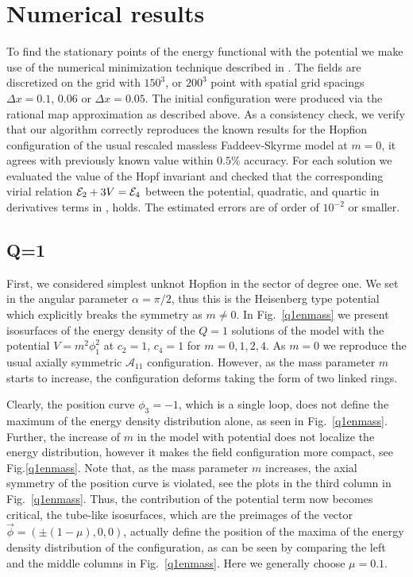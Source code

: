 \documentclass[12pt,a4paper]{article}
\begin{document}
\section{Numerical results}
To find the stationary points of the energy functional  with the potential
 we make use of the numerical minimization technique described in \cite{Samoilenka:2015bsf,Samoilenka:2016wys}.
The fields are discretized on the grid with $150^3$, or $200^3$ point with  spatial grid spacings
$\Delta x=0.1$, $0.06$ or $\Delta x=0.05$. The initial configuration were produced via the rational map
approximation as described above.
As a consistency check, we verify that our algorithm correctly reproduces the known results for the Hopfion
configuration of the usual rescaled
massless Faddeev-Skyrme model at $m=0$, it agrees with previously known value within $0.5 \%$ accuracy.
For each solution  we evaluated the value of the Hopf invariant and checked that the
corresponding virial relation $  \mathcal{E}_2+3 V = \mathcal{E}_4 $
between the potential, quadratic, and quartic in derivatives terms in ,
holds. The estimated errors are of order of $10^{-2}$ or smaller.



\subsection{Q=1}
First, we considered simplest unknot Hopfion in the sector of degree one. We set in 
the angular parameter $\alpha=\pi/2$, thus this is the Heisenberg type potential which explicitly breaks the symmetry as $m\neq 0$.
In Fig.~\ref{q1enmass} we present isosurfaces of the energy density of the $Q=1$ solutions of the model
 with the potential $V=m^2\phi_1^2$ at $c_2=1$, $c_4=1$ for $m=0, 1, 2, 4$.
As $m=0$ we reproduce the usual axially symmetric $\mathcal{A}_{11}$ configuration. However, as the mass parameter $m$ starts to increase,
the configuration deforms taking the form of  two linked rings.

Clearly, the position curve $\phi_3=-1$,
which is a single loop, does not define the maximum of the energy
density distribution alone, as seen in  Fig.~\ref{q1enmass}.
Further, the increase of $m$ in the model with potential  does not
localize the energy distribution, however it makes the field configuration more compact, see Fig.\ref{q1enmass}.
Note that, as the mass parameter
$m$ increases, the axial symmetry of the position curve is violated, see the plots in the third column in  Fig.~\ref{q1enmass}.
Thus, the contribution of the
potential term now becomes critical, the tube-like isosurfaces, which are the preimages of the vector
$\vec \phi = (\pm (1 - \mu), 0,0)$,
actually define the position of the maxima  of the energy density distribution of the configuration, as can be seen by comparing
the left and the middle columns in  Fig.~\ref{q1enmass}. Here we generally choose $\mu=0.1$.
\end{document}
